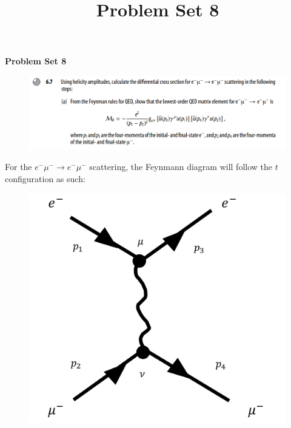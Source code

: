\documentclass[11pt]{article}
\theoremstyle{definition}
\begin{document}
\setcounter{section}{2}
\title{Problem Set 8}

\pagestyle{fancy}
\fancyhf{}

\begin{center}
{\LARGE \bf Problem Set 8}\\
\end{center}

\begin{figure}[H]
    \centering
    \includegraphics[scale = 0.5]{6.7a.png}
\end{figure}


For the $e^-\mu^- \to e^-\mu^-$ scattering, the Feynmann diagram will follow the $t$ configuration as such:

\begin{figure}[H]
    \centering
    \includegraphics[scale = 0.5]{electron muon scatter.png}
\end{figure}
\end{document}
